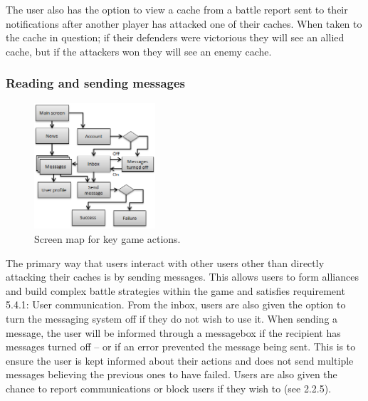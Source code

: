 The user also has the option to view a cache from a battle report sent to their notifications after another player has attacked one of their caches. When taken to the cache in question; if their defenders were victorious they will see an allied cache, but if the attackers won they will see an enemy cache.

\subsubsection{Reading and sending messages}
\begin{figure}
	\vspace{-75pt}
	\begin{center}
	\includegraphics[width=0.4\textwidth]{images/sending_messages}
	\caption{Screen map for key game actions.}
	\label{sending_messages}
	\end{center}
\end{figure}
The primary way that users interact with other users other than directly attacking their caches is by sending messages. This allows users to form alliances and build complex battle strategies within the game and satisfies requirement 5.4.1: User communication. From the inbox, users are also given the option to turn the messaging system off if they do not wish to use it. When sending a message, the user will be informed through a messagebox if the recipient has messages turned off – or if an error prevented the message being sent. This is to ensure the user is kept informed about their actions and does not send multiple messages believing the previous ones to have failed. Users are also given the chance to report communications or block users if they wish to (see 2.2.5).

